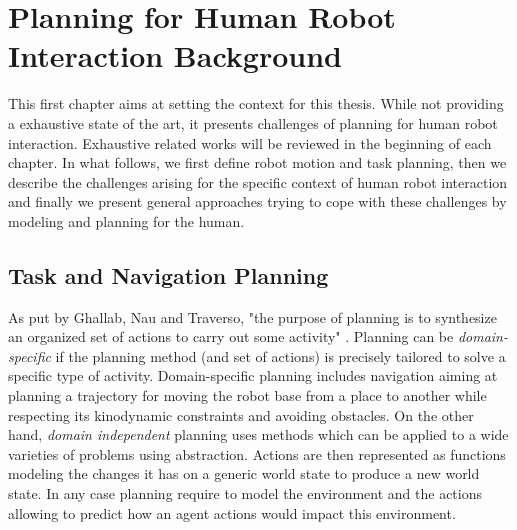 \documentclass[a4paper,11pt,twoside]{StyleThese}
\begin{document}
\setcounter{chapter}{0} %
\dominitoc
\faketableofcontents
\fi

\chapter{Planning for Human Robot Interaction Background}
\minitoc


This first chapter aims at setting the context for this thesis. While not providing a exhaustive state of the art, it presents challenges of planning for human robot interaction. Exhaustive related works will be reviewed in the beginning of each chapter. In what follows, we first define robot motion and task planning, then we describe the challenges arising for the specific context of human robot interaction and finally we present general approaches trying to cope with these challenges by modeling and planning for the human.

\section{Task and Navigation Planning}
As put by Ghallab, Nau and Traverso, "the purpose of planning is to synthesize an organized set of actions to carry out some activity" \cite{ghallab_nau_traverso_2016}. Planning can be \textit{domain-specific} if the planning method (and set of actions) is precisely tailored to solve a specific type of activity. Domain-specific planning includes navigation aiming at planning a trajectory for moving the robot base from a place to another while respecting its kinodynamic constraints and avoiding obstacles. On the other hand, \textit{domain independent} planning uses methods which can be applied to a wide varieties of problems using abstraction. Actions are then represented as functions modeling the changes it has on a generic world state to produce a new world state. In any case planning require to model the environment and the actions allowing to predict how an agent actions would impact this environment.
\end{document}
